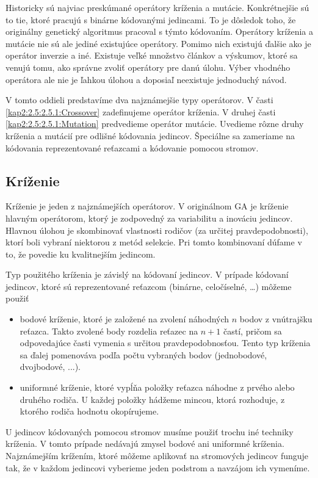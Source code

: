 Historicky sú najviac preskúmané operátory kríženia a mutácie. Konkrétnejšie sú to tie, ktoré pracujú s binárne kódovanými jedincami. To je dôsledok toho, že originálny genetický algoritmus pracoval s týmto kódovaním. Operátory kríženia a mutácie nie sú ale jediné existujúce operátory. Pomimo nich existujú ďalšie ako je operátor inverzie a iné.
Existuje veľké množstvo článkov a výskumov, ktoré sa venujú tomu, ako správne zvoliť operátory pre danú úlohu. Výber vhodného operátora ale nie je ľahkou úlohou a doposiaľ neexistuje jednoduchý návod.

V tomto oddieli predstavíme dva najznámejšie typy operátorov. V časti \ref{kap2:2.5:2.5.1:Crossover} zadefinujeme operátor kríženia. V druhej časti \ref{kap2:2.5:2.5.1:Mutation} predvedieme operátor mutácie. Uvedieme rôzne druhy kríženia a mutácií pre odlišné kódovania jedincov. Špeciálne sa zameriame na kódovania reprezentované reťazcami a kódovanie pomocou stromov.
\subsection{Kríženie}
Kríženie je jeden z najznámejších operátorov. V originálnom GA je kríženie hlavným operátorom, ktorý je zodpovedný za variabilitu a inováciu jedincov. Hlavnou úlohou je skombinovať vlastnosti rodičov (za určitej pravdepodobnosti), ktorí boli vybraní niektorou z metód selekcie. Pri tomto kombinovaní dúfame v to, že povedie ku kvalitnejším jedincom.

Typ použitého kríženia je závislý na kódovaní jedincov.
V prípade kódovaní jedincov, ktoré sú reprezentované reťazcom (binárne, celočíselné, \ldots) môžeme použiť
\begin{itemize}\label{kap2:2.5:2.5.1:Crossover}
\item bodové kríženie, ktoré je založené na zvolení náhodných $n$ bodov z vnútrajšku reťazca. Takto zvolené body rozdelia reťazec na $n+1$ častí, pričom sa odpovedajúce časti vymenia s určitou pravdepodobnosťou. Tento typ kríženia sa ďalej pomenováva podľa počtu vybraných bodov (jednobodové, dvojbodové, ...).
\item uniformné kríženie, ktoré vypĺňa položky reťazca náhodne z prvého alebo druhého rodiča. U každej položky hádžeme mincou, ktorá rozhoduje, z ktorého rodiča hodnotu okopírujeme.
\end{itemize}
U jedincov kódovaných pomocou stromov musíme použiť trochu iné techniky kríženia. V tomto prípade nedávajú zmysel bodové ani uniformné kríženia. Najznámejším krížením, ktoré môžeme aplikovať na stromových jedincov funguje tak, že v každom jedincovi vyberieme jeden podstrom a navzájom ich vymeníme.

